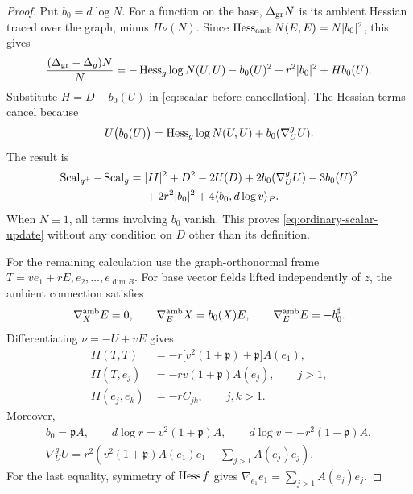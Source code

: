 \begin{proof}
Put $b_0=d\log N$. For a function on the base,
$\Delta_{\rm gr}N$ is its ambient Hessian traced over the graph, minus $H\nu(N)$. Since
$\operatorname{Hess}_{\rm amb}N(E,E)=N\lvert b_0\rvert^2$, this gives
\begin{equation}\label{eq:graph-laplacian-correction}
 \frac{(\Delta_{\rm gr}-\Delta_g)N}{N}
 =-\operatorname{Hess}_g\log N(U,U)-b_0(U)^2
       +r^2\lvert b_0\rvert^2+H b_0(U).
\end{equation}
Substitute $H=D-b_0(U)$ in \eqref{eq:scalar-before-cancellation}. The Hessian terms cancel because
\[
 U\bigl(b_0(U)\bigr)
   =\operatorname{Hess}_g\log N(U,U)+b_0(\nabla^g_UU).
\]
The result is
\begin{equation}\label{eq:scalar-intermediate}
 \begin{split}
 \operatorname{Scal}_{g^+}-\operatorname{Scal}_g
 ={}&\lvert II\rvert^2+D^2-2U(D)
       +2b_0(\nabla^g_UU)-3b_0(U)^2\\
 &+2r^2\lvert b_0\rvert^2+4\langle b_0,d\log v\rangle_{P}.
 \end{split}
\end{equation}
When $N\equiv1$, all terms involving $b_0$ vanish. This proves
\eqref{eq:ordinary-scalar-update} without any condition on $D$ other than its definition.

For the remaining calculation use the graph-orthonormal frame
$T=ve_1+rE,e_2,\ldots,e_{\dim B}$. For base vector fields lifted independently of $z$, the ambient connection satisfies
\[
 \nabla_X^{\rm amb}E=0,\qquad
 \nabla_E^{\rm amb}X=b_0(X)E,\qquad
 \nabla_E^{\rm amb}E=-b_0^{\sharp}.
\]
Differentiating $\nu=-U+vE$ gives
\begin{equation}\label{eq:graph-second-form}
 \begin{aligned}
 II(T,T)&=-r\bigl[v^2(1+\mathfrak p)+\mathfrak p\bigr]A(e_1),\\
 II(T,e_j)&=-rv(1+\mathfrak p)A(e_j),\qquad j>1,\\
 II(e_j,e_k)&=-rC_{jk},\qquad j,k>1.
 \end{aligned}
\end{equation}
Moreover,
\begin{equation}\label{eq:graph-log-derivatives}
 \begin{gathered}
 b_0=\mathfrak p A,\qquad
 d\log r=v^2(1+\mathfrak p)A,\qquad
 d\log v=-r^2(1+\mathfrak p)A,\\
 \nabla^g_UU=r^2\left(v^2(1+\mathfrak p)A(e_1)e_1
                         +\sum_{j>1}A(e_j)e_j\right).
 \end{gathered}
\end{equation}
For the last equality, symmetry of $\operatorname{Hess} f$ gives
$\nabla_{e_1}e_1=\sum_{j>1}A(e_j)e_j$.


\end{proof}
